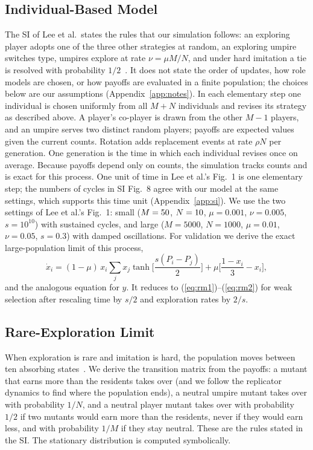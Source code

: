 \documentclass[journal]{IEEEtran}
\begin{document}
\subsection{Individual-Based Model}
The SI of Lee et al.\ states the rules that our simulation follows: an exploring player adopts
one of the three other strategies at random, an exploring umpire switches type, umpires explore
at rate $\nu=\mu M/N$, and under hard imitation a tie is resolved with probability
$1/2$~\cite{lee2019social}. It does not state the order of updates, how role models are chosen,
or how payoffs are evaluated in a finite population; the choices below are our assumptions
(Appendix~\ref{app:notes}). In each elementary step one individual is chosen
uniformly from all $M+N$ individuals and revises its strategy as described above. A player's
co-player is drawn from the other $M-1$ players, and an umpire serves two distinct random players;
payoffs are expected values given the current counts. Rotation adds replacement events at rate
$\rho N$ per generation. One generation is the time in which each individual revises once on
average. Because payoffs depend only on counts, the simulation tracks counts and is exact for
this process. One unit of time in Lee et al.'s Fig.~1 is one elementary step; the numbers of
cycles in SI Fig.~8 agree with our model at the same settings, which supports this time unit
(Appendix~\ref{app:si}). We use the two settings of Lee et al.'s Fig.~1: small ($M=50$,
$N=10$,
$\mu=0.001$, $\nu=0.005$, $s=10^{10}$) with sustained cycles, and large ($M=5000$, $N=1000$,
$\mu=0.01$, $\nu=0.05$, $s=0.3$) with damped oscillations. For validation we derive the exact
large-population limit of this process,
\begin{equation}
\dot x_i=(1-\mu)\,x_i\sum_j x_j\tanh\!\Big[\frac{s(P_i-P_j)}{2}\Big]+\mu\Big[\frac{1-x_i}{3}-x_i\Big],
\end{equation}
and the analogous equation for $y$. It reduces to (\ref{eq:rm1})--(\ref{eq:rm2}) for weak selection
after rescaling time by $s/2$ and exploration rates by $2/s$.

\subsection{Rare-Exploration Limit}\label{sec:markov}
When exploration is rare and imitation is hard, the population moves between ten absorbing
states~\cite{fudenberg2006imitation}. We derive the transition matrix from the payoffs: a mutant
that earns more than the residents takes over (and we follow the replicator dynamics to find where
the population ends), a neutral umpire mutant takes over with
probability $1/N$, and a neutral player mutant takes over with probability $1/2$ if two mutants
would earn more than the residents, never if they would earn less, and with probability $1/M$ if
they stay neutral. These are the rules stated in the SI. The stationary distribution is computed symbolically.
\end{document}
